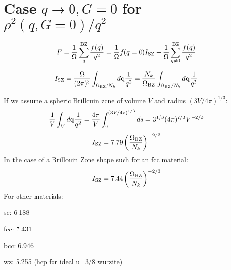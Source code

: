 \documentclass[fleqn]{article}
\begin{document}
\newpage


\section{Case $q \rightarrow 0, G=0$ for $\rho^2(q,G=0) / q^2$}

\[
F = \frac{1}{\Omega} \sum_q^{\rm BZ} \frac{f(q)}{q^2} =
\frac{1}{\Omega} f(q=0) I_{\rm SZ} + \frac{1}{\Omega} \sum_{q\ne 0}^{\rm BZ} \frac{f(q)}{q^2}
\]

\[
I_{\rm SZ} = \frac{\Omega}{(2\pi)^3} \int_{\Omega_{\rm BZ}/N_k} d{\bf q} \frac{1}{q^2} =
\frac{N_k}{\Omega_{\rm BZ}} \int_{\Omega_{\rm BZ}/N_k} d{\bf q} \frac{1}{q^2}
\]

If we assume a spheric Brillouin zone of volume $V$ and radius $(3 V/4\pi)^{1/3}$:
\[
\frac{1}{V} \int_V d{\bf q} \frac{1}{q^2} = \frac{4\pi}{V} \int_0^{(3 V/4\pi)^{1/3}} dq
= 3^{1/3} (4\pi)^{2/3} V^{-2/3}
\]
\[
I_{\rm SZ} = 7.79 \left( \frac{\Omega_{\rm BZ}}{N_k}\right)^{-2/3}
\]
In the case of a Brillouin Zone shape such for an fcc material:
\[
I_{\rm SZ} = 7.44 \left( \frac{\Omega_{\rm BZ}}{N_k}\right)^{-2/3}
\]
For other materials:

sc: 6.188

fcc: 7.431

bcc: 6.946

wz: 5.255 (hcp for ideal u=3/8 wurzite)
\end{document}
